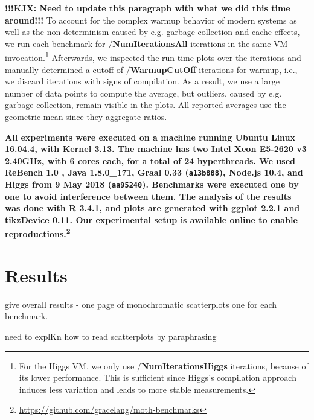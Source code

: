 \documentclass[sigplan,10pt,review,screen]{acmart}\settopmatter{printfolios=true}
\newcommand{\code}[1]{\texttt{#1}}
\newcommand{\ie}{i.e.\xspace}
\newcommand{\eg}{e.g.\xspace}
\begin{document}
\textbf{!!!KJX: Need to update this paragraph with what we did this time around!!!}
To account for the complex warmup behavior
of modern systems\citep{Barrett:2017:VMW} as well as
the non-determinism caused by \eg garbage collection and cache effects,
we run each benchmark for \textbf{$/$NumIterationsAll} iterations in the same
VM invocation.\footnote{
For the Higgs VM, we only use \textbf{$/$NumIterationsHiggs} iterations,
because of its lower performance.
This is sufficient since Higgs's compilation approach induces less variation
and leads to more stable measurements.}
Afterwards, we inspected the run-time plots over the iterations
and manually determined a cutoff of \textbf{$/$WarmupCutOff} iterations for warmup,
\ie, we discard iterations with signs of compilation.
As a result, we use a large number of data points to compute the average,
but outliers, caused by \eg garbage collection, remain visible in the plots.
All reported averages use the geometric mean since they aggregate
ratios.


\textbf{
%
All experiments were executed on a machine running Ubuntu Linux 16.04.4,
with Kernel 3.13.
The machine has two Intel Xeon E5-2620 v3 2.40GHz,
with 6 cores each, for a total of 24 hyperthreads.
We used ReBench 1.0 \citep{ReBench:2018}, Java 1.8.0\_171, Graal 0.33 (\code{a13b888}),
Node.js 10.4, and Higgs from 9 May 2018 (\code{aa95240}).
Benchmarks were executed one by one to avoid interference between them.
The analysis of the results was done with R 3.4.1,
and plots are generated with ggplot 2.2.1 and tikzDevice 0.11.
Our experimental setup is available online to enable reproductions.\footnote{
\url{https://github.com/gracelang/moth-benchmarks}}
}


\section{Results}
\label{s-overall}

give overall results - one page of monochromatic scatterplots one for
each benchmark.

need to explKn how to read scatterplots by paraphrasing
\cite{vitousek-transient-arXive-2019}
\end{document}
